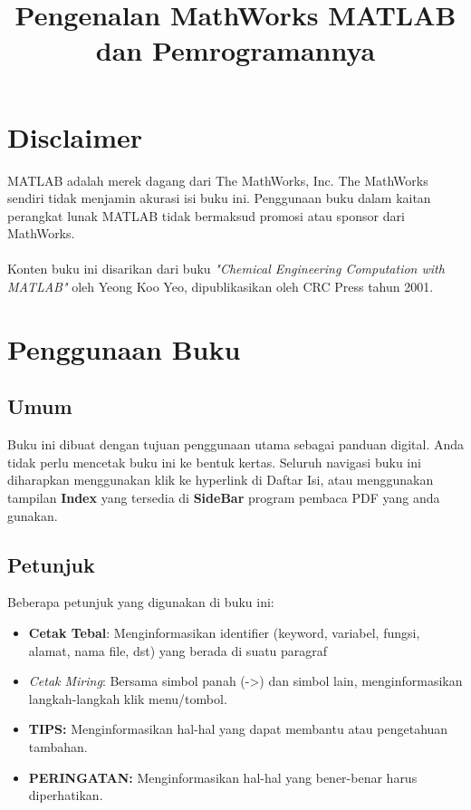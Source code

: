 \documentclass[12pt]{book}
\title{\LARGE \bf
	Pengenalan MathWorks MATLAB dan Pemrogramannya\\
}
\author{}
\date{}
\begin{document}
	\frontmatter
	\maketitle
	
	
	\newpage
	\tableofcontents
	
	
	\newpage
	\chapter{Disclaimer}
	
	MATLAB adalah merek dagang dari The MathWorks, Inc.
	The MathWorks sendiri tidak menjamin akurasi isi buku ini.
	Penggunaan buku dalam kaitan perangkat lunak MATLAB tidak bermaksud promosi atau sponsor dari MathWorks.
	\\
	\\
	Konten buku ini disarikan dari buku \textit{"Chemical Engineering Computation with MATLAB"} oleh Yeong Koo Yeo,
	dipublikasikan oleh CRC Press tahun 2001.
	
	
	\newpage
	\chapter{Penggunaan Buku}
	
	\section{Umum}
	Buku ini dibuat dengan tujuan penggunaan utama sebagai panduan digital.
	Anda tidak perlu mencetak buku ini ke bentuk kertas.
	Seluruh navigasi buku ini diharapkan menggunakan klik ke hyperlink di Daftar Isi,
	atau menggunakan tampilan \textbf{Index} yang tersedia di \textbf{SideBar} program pembaca PDF yang anda gunakan.
	
	\section{Petunjuk}
	Beberapa petunjuk yang digunakan di buku ini:
	\begin{itemize}
		\item \textbf{Cetak Tebal}: Menginformasikan identifier (keyword, variabel, fungsi, alamat, nama file, dst) yang berada di suatu paragraf
		\item \textit{Cetak Miring}: Bersama simbol panah (->) dan simbol lain, menginformasikan langkah-langkah klik menu/tombol.
		\item \textbf{TIPS:} Menginformasikan hal-hal yang dapat membantu atau pengetahuan tambahan.
		\item \textbf{PERINGATAN:} Menginformasikan hal-hal yang bener-benar harus diperhatikan.
	\end{itemize}
\end{document}

